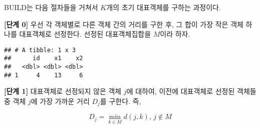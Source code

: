 \documentclass[
]{book}
\newenvironment{Shaded}{\begin{snugshade}}{\end{snugshade}}
\newcommand{\AttributeTok}[1]{\textcolor[rgb]{0.77,0.63,0.00}{#1}}
\newcommand{\ConstantTok}[1]{\textcolor[rgb]{0.00,0.00,0.00}{#1}}
\newcommand{\DecValTok}[1]{\textcolor[rgb]{0.00,0.00,0.81}{#1}}
\newcommand{\FunctionTok}[1]{\textcolor[rgb]{0.00,0.00,0.00}{#1}}
\newcommand{\NormalTok}[1]{#1}
\newcommand{\OtherTok}[1]{\textcolor[rgb]{0.56,0.35,0.01}{#1}}
\newcommand{\SpecialCharTok}[1]{\textcolor[rgb]{0.00,0.00,0.00}{#1}}
\begin{document}
BUILD는 다음 절차들을 거쳐서 \(K\)개의 초기 대표객체를 구하는 과정이다.

\textbf{{[}단계 0{]}} 우선 각 객체별로 다른 객체 간의 거리를 구한 후, 그 합이 가장 작은 객체 하나를 대표객체로 선정한다. 선정된 대표객체집합을 \(M\)이라 하자.

\begin{Shaded}
\end{Shaded}

\begin{verbatim}
## # A tibble: 1 x 3
##      id    x1    x2
##   <dbl> <dbl> <dbl>
## 1     4    13     6
\end{verbatim}

\textbf{{[}단계 1{]}} 대표객체로 선정되지 않은 객체 \(j\)에 대하여, 이전에 대표객체로 선정된 객체들 중 객체 \(j\)에 가장 가까운 거리 \(D_j\)를 구한다. 즉,

\begin{equation*}
D_j = \min_{k \in M} d(j, k), \, j \notin M
\end{equation*}
\end{document}
